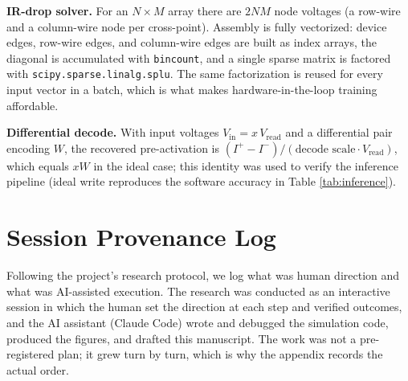 \textbf{IR-drop solver.} For an $N\times M$ array there are $2NM$ node voltages
(a row-wire and a column-wire node per cross-point). Assembly is fully
vectorized: device edges, row-wire edges, and column-wire edges are built as
index arrays, the diagonal is accumulated with \texttt{bincount}, and a single
sparse matrix is factored with \texttt{scipy.sparse.linalg.splu}. The same
factorization is reused for every input vector in a batch, which is what makes
hardware-in-the-loop training affordable.

\textbf{Differential decode.} With input voltages $V_\mathrm{in}=x\,V_\mathrm{read}$
and a differential pair encoding $W$, the recovered pre-activation is
$(I^{+}-I^{-})/(\text{decode scale}\cdot V_\mathrm{read})$, which equals $xW$ in
the ideal case; this identity was used to verify the inference pipeline (ideal
write reproduces the software accuracy in Table \ref{tab:inference}).

\section{Session Provenance Log}
\label{app:session}
Following the project's research protocol, we log what was human direction and
what was AI-assisted execution. The research was conducted as an interactive
session in which the human set the direction at each step and verified outcomes,
and the AI assistant (Claude Code) wrote and debugged the simulation code,
produced the figures, and drafted this manuscript. The work was not a
pre-registered plan; it grew turn by turn, which is why the appendix records the
actual order.


